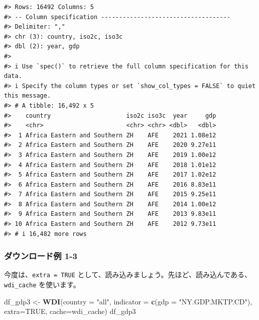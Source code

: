 \documentclass[
  xelatex, ja=standard]{bxjsbook}
\newenvironment{Shaded}{\begin{snugshade}}{\end{snugshade}}
\newcommand{\AttributeTok}[1]{\textcolor[rgb]{0.13,0.29,0.53}{#1}}
\newcommand{\ConstantTok}[1]{\textcolor[rgb]{0.56,0.35,0.01}{#1}}
\newcommand{\FunctionTok}[1]{\textcolor[rgb]{0.13,0.29,0.53}{\textbf{#1}}}
\newcommand{\NormalTok}[1]{#1}
\newcommand{\OtherTok}[1]{\textcolor[rgb]{0.56,0.35,0.01}{#1}}
\newcommand{\StringTok}[1]{\textcolor[rgb]{0.31,0.60,0.02}{#1}}
\theoremstyle{definition}
\theoremstyle{definition}
\theoremstyle{definition}
\theoremstyle{definition}
\theoremstyle{remark}
\begin{document}
\begin{verbatim}
#> Rows: 16492 Columns: 5
#> -- Column specification ------------------------------------
#> Delimiter: ","
#> chr (3): country, iso2c, iso3c
#> dbl (2): year, gdp
#> 
#> i Use `spec()` to retrieve the full column specification for this data.
#> i Specify the column types or set `show_col_types = FALSE` to quiet this message.
#> # A tibble: 16,492 x 5
#>    country                     iso2c iso3c  year     gdp
#>    <chr>                       <chr> <chr> <dbl>   <dbl>
#>  1 Africa Eastern and Southern ZH    AFE    2021 1.08e12
#>  2 Africa Eastern and Southern ZH    AFE    2020 9.27e11
#>  3 Africa Eastern and Southern ZH    AFE    2019 1.00e12
#>  4 Africa Eastern and Southern ZH    AFE    2018 1.01e12
#>  5 Africa Eastern and Southern ZH    AFE    2017 1.02e12
#>  6 Africa Eastern and Southern ZH    AFE    2016 8.83e11
#>  7 Africa Eastern and Southern ZH    AFE    2015 9.25e11
#>  8 Africa Eastern and Southern ZH    AFE    2014 1.00e12
#>  9 Africa Eastern and Southern ZH    AFE    2013 9.83e11
#> 10 Africa Eastern and Southern ZH    AFE    2012 9.73e11
#> # i 16,482 more rows
\end{verbatim}

\hypertarget{ux30c0ux30a6ux30f3ux30edux30fcux30c9ux4f8b-1-3}{%
\subsubsection{\texorpdfstring{ダウンロード例 1-3\\
}{ダウンロード例 1-3 }}\label{ux30c0ux30a6ux30f3ux30edux30fcux30c9ux4f8b-1-3}}

今度は、\texttt{extra\ =\ TRUE} として、読み込みましょう。先ほど、読み込んである、\texttt{wdi\_cache} を使います。

\begin{Shaded}
\begin{Highlighting}[]
\NormalTok{df\_gdp3 }\OtherTok{\textless{}{-}} \FunctionTok{WDI}\NormalTok{(}\AttributeTok{country =} \StringTok{"all"}\NormalTok{, }\AttributeTok{indicator =} \FunctionTok{c}\NormalTok{(}\AttributeTok{gdp =} \StringTok{"NY.GDP.MKTP.CD"}\NormalTok{), }
               \AttributeTok{extra=}\ConstantTok{TRUE}\NormalTok{, }\AttributeTok{cache=}\NormalTok{wdi\_cache)}
\NormalTok{df\_gdp3}
\end{Highlighting}
\end{Shaded}
\end{document}
